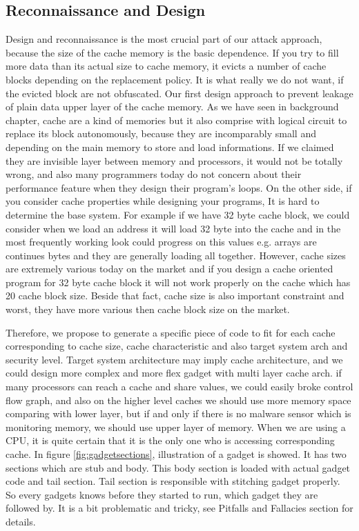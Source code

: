 	    \subsection{Reconnaissance and Design}
	    Design and reconnaissance is the most crucial part of our attack approach, because the size of the cache memory is the basic dependence. If you try to fill more data than its actual size to cache memory, it evicts a number of cache blocks depending on the replacement policy. It is what really we do not want, if the evicted block are not obfuscated. Our first design approach to prevent leakage of plain data upper layer of the cache memory. As we have seen in background chapter, cache are a kind of memories but it also comprise with logical circuit to replace its block autonomously, because they are incomparably small and depending on the main memory to store and load informations. If we claimed they are invisible layer between memory and processors, it would not be totally wrong, and also many programmers today do not concern about their performance feature when they design their program's loops. On the other side, if you consider cache properties while designing your programs, It is hard to determine the base system. For example if we have 32 byte cache block, we could consider when we load an address it will load 32 byte into the cache and in the most frequently working look could progress on this values e.g. arrays are continues bytes and they are generally loading all together. However, cache sizes are extremely various today on the market and if you design a cache oriented program for 32 byte cache block it will not work properly on the cache which has 20 cache block size. Beside that fact, cache size is also important constraint and worst, they have more various then cache block size on the market.

	    Therefore, we propose to generate a specific piece of code to fit for each cache corresponding to cache size, cache characteristic and also target system  arch and security level. Target system architecture may imply cache architecture, and we could design more complex and more flex gadget with multi layer cache arch. if many processors can reach a cache and share values, we could easily broke control flow graph\cite{ramilli2011multiprocess}, and also on the higher level caches we should use more memory space comparing with lower layer, but if and only if there is no malware sensor which is monitoring memory, we should use upper layer of memory. When we are using a CPU, it is quite certain that it is the only one who is accessing corresponding cache. In figure \ref{fig:gadgetsections}, illustration of a gadget is showed. It has two sections which are stub and body. This body section is loaded with actual gadget code and tail section. Tail section is responsible with stitching gadget properly. So every gadgets knows before they started to run, which gadget they are followed by. It is a bit problematic and tricky, see Pitfalls and Fallacies section for details.

